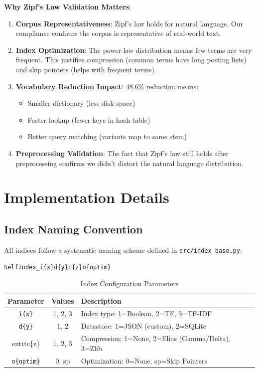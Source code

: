 \documentclass[12pt,a4paper]{article}
\begin{document}
\textbf{Why Zipf's Law Validation Matters}:
\begin{enumerate}
    \item \textbf{Corpus Representativeness}: Zipf's law holds for natural language. Our compliance confirms the corpus is representative of real-world text.
    \item \textbf{Index Optimization}: The power-law distribution means few terms are very frequent. This justifies compression (common terms have long posting lists) and skip pointers (helps with frequent terms).
    \item \textbf{Vocabulary Reduction Impact}: 48.6\% reduction means:
    \begin{itemize}
        \item Smaller dictionary (less disk space)
        \item Faster lookup (fewer keys in hash table)
        \item Better query matching (variants map to same stem)
    \end{itemize}
    \item \textbf{Preprocessing Validation}: The fact that Zipf's law still holds after preprocessing confirms we didn't distort the natural language distribution.
\end{enumerate}

\section{Implementation Details}

\subsection{Index Naming Convention}

All indices follow a systematic naming scheme defined in \texttt{src/index\_base.py}:

\begin{center}
\texttt{SelfIndex\_i\{x\}d\{y\}c\{z\}o\{optim\}}
\end{center}

\begin{table}[H]
\centering
\begin{tabular}{ccl}
\toprule
\textbf{Parameter} & \textbf{Values} & \textbf{Description} \\
\midrule
\texttt{i\{x\}} & 1, 2, 3 & Index type: 1=Boolean, 2=TF, 3=TF-IDF \\
\texttt{d\{y\}} & 1, 2 & Datastore: 1=JSON (custom), 2=SQLite \\
	exttt{c\{z\}} & 1, 2, 3 & Compression: 1=None, 2=Elias (Gamma/Delta), 3=Zlib \\
\texttt{o\{optim\}} & 0, sp & Optimization: 0=None, sp=Skip Pointers \\
\bottomrule
\end{tabular}
\caption{Index Configuration Parameters}
\end{table}
\end{document}
